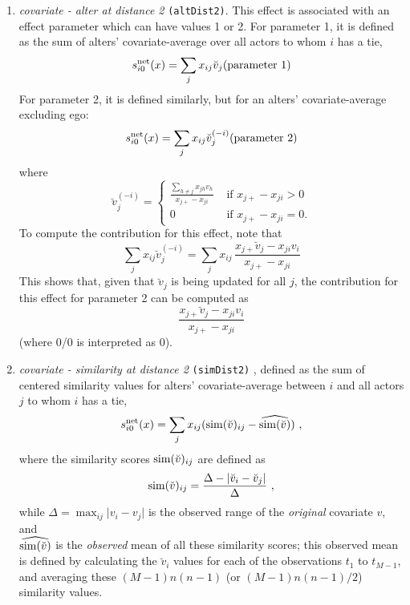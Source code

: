 \documentclass[a4paper,fleqn,11pt]{article}
\newcommand{\+}{\, + \,}
\newcommand{\vit}{\theenumi}
\newcounter{savenumi}
\begin{document}
\begin{enumerate}
\setcounter{enumi}{\value{savenumi}}

\item \emph{covariate - alter at distance 2} \texttt{(altDist2)}. %
      This effect is associated with an effect parameter
      which can have values 1 or 2.
      For parameter 1, it is
      defined as the sum of alters' covariate-average over all actors
      to whom $i$ has a tie,
\[
 s^{\rm net}_{i\vit}(x) = \sum_j x_{ij} \breve v_j \hfill (\text{parameter 1}) \hfill
\]
      For parameter 2, it is defined similarly,
      but for an alters' covariate-average excluding
      ego:
\[
 s^{\rm net}_{i\vit}(x) = \sum_j x_{ij} \breve v_j^{(-i)} \hfill (\text{parameter 2}) \hfill
\]
      where
\begin{equation}
  \breve v_j^{(-i)} = \left\{\begin{array}{ll} \displaystyle
         \frac{\sum_{h \neq j} x_{jh}v_h}{x_{j+} - x_{ji}}  &  \text{ if } x_{j+} - x_{ji} > 0     \\
         0                                &  \text{ if } x_{j+}- x_{ji} = 0  .
  \end{array}   \right.            \label{alt_av2}
\end{equation}
      To compute the contribution for this effect, note that
\[
 \sum_j x_{ij} \breve v_j^{(-i)} = \sum_j x_{ij} \, \frac{x_{j+} \breve v_j - x_{ji}v_i}{x_{j+}-x_{ji}}
\]
      This shows that, given that $\breve v_j$ is being updated for all $j$, the contribution
      for this effect for parameter 2 can be computed as
      \[
       \frac{x_{j+} \breve v_j - x_{ji}v_i}{x_{j+}-x_{ji}}
      \]
      (where 0/0 is interpreted as 0).
\item \emph{covariate - similarity at distance 2} \texttt{(simDist2)} , %
      defined as the sum of centered similarity
      values for alters' covariate-average between $i$ and all actors
      $j$ to whom $i$ has a tie,
\[
 s^{\rm net}_{i\vit}(x) = \sum_j x_{ij} ({\rm sim}(\breve v)_{ij}
  - \widehat{{\rm sim}(\breve v)}) \ ,
\]
 where the similarity scores ${\rm sim}(\breve v)_{ij}$ are defined as
\[
{\rm sim}(\breve v)_{ij}=
 \frac{\Delta-\vert \breve v_i - \breve v_j \vert}{\Delta} \ ,
\]
 while
 $\Delta=\max_{ij}\vert v_i - v_j \vert$ is the observed range of the
 \emph{original} covariate $v$, and\\
 $\widehat{{\rm sim}(\breve v)}$ is the
 \emph{observed} mean of all these similarity scores;
 this observed mean is defined by calculating the $\breve v_i$ values
 for each of the observations $t_1$ to $t_{M-1}$, and averaging
 these
 $(M-1)n(n-1)$ (or $(M-1)n(n-1)/2$) similarity values.
\end{enumerate}
\end{document}

